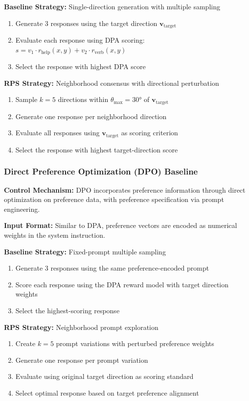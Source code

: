 \documentclass{article} %
\begin{document}
\textbf{Baseline Strategy:} Single-direction generation with multiple sampling
\begin{enumerate}
    \item Generate 3 responses using the target direction $\mathbf{v}_{\text{target}}$
    \item Evaluate each response using DPA scoring: $s = v_1 \cdot r_{\text{help}}(x,y) + v_2 \cdot r_{\text{verb}}(x,y)$
    \item Select the response with highest DPA score
\end{enumerate}

\textbf{RPS Strategy:} Neighborhood consensus with directional perturbation
\begin{enumerate}
    \item Sample $k=5$ directions within $\theta_{\max}=30°$ of $\mathbf{v}_{\text{target}}$
    \item Generate one response per neighborhood direction
    \item Evaluate all responses using $\mathbf{v}_{\text{target}}$ as scoring criterion
    \item Select the response with highest target-direction score
\end{enumerate}

\subsubsection{Direct Preference Optimization (DPO) Baseline}

\textbf{Control Mechanism:} DPO incorporates preference information through direct optimization on preference data, with preference specification via prompt engineering.

\textbf{Input Format:} Similar to DPA, preference vectors are encoded as numerical weights in the system instruction.

\textbf{Baseline Strategy:} Fixed-prompt multiple sampling
\begin{enumerate}
    \item Generate 3 responses using the same preference-encoded prompt
    \item Score each response using the DPA reward model with target direction weights
    \item Select the highest-scoring response
\end{enumerate}

\textbf{RPS Strategy:} Neighborhood prompt exploration
\begin{enumerate}
    \item Create $k=5$ prompt variations with perturbed preference weights
    \item Generate one response per prompt variation
    \item Evaluate using original target direction as scoring standard
    \item Select optimal response based on target preference alignment
\end{enumerate}
\end{document}
